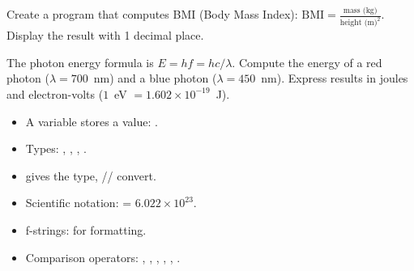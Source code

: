 \begin{exercise}
Create a program that computes BMI (Body Mass Index): $\text{BMI} = \frac{\text{mass (kg)}}{\text{height (m)}^2}$. Display the result with 1 decimal place.
\end{exercise}

\begin{exercise}
The photon energy formula is $E = hf = hc/\lambda$. Compute the energy of a red photon ($\lambda = 700$~nm) and a blue photon ($\lambda = 450$~nm). Express results in joules and electron-volts ($1$~eV $= 1.602 \times 10^{-19}$~J).
\end{exercise}

\begin{keyformulas}[title=\textbf{Chapter Summary}]
\begin{itemize}
\item A variable stores a value: .
\item Types: , , , .
\item {} gives the type, // convert.
\item Scientific notation:  = $6.022 \times 10^{23}$.
\item f-strings:  for formatting.
\item Comparison operators: \py{==}, \py{!=}, \py{<}, \py{>}, , .
\end{itemize}
\end{keyformulas}
